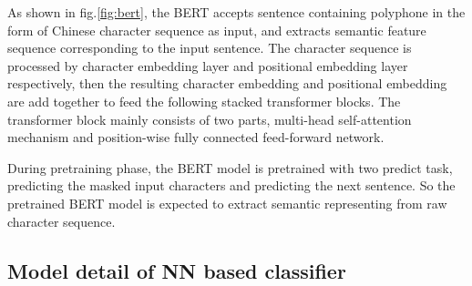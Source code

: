 \documentclass[a4paper]{article}
\begin{document}
As shown in fig.\ref{fig:bert}, the BERT accepts sentence containing polyphone in the form of Chinese character sequence as input, and extracts semantic feature sequence corresponding to the input sentence.  The character sequence is processed by character embedding layer and positional embedding layer respectively, then the resulting character embedding and positional embedding are add together to feed the following stacked transformer blocks. The transformer block mainly consists of two parts, multi-head self-attention mechanism and position-wise fully connected feed-forward network.

During pretraining phase, the BERT model is pretrained with two predict task, predicting the masked input characters and predicting the next sentence. So the pretrained BERT model is expected to extract semantic representing from raw character sequence.


\subsection{Model detail of NN based classifier}
\end{document}
